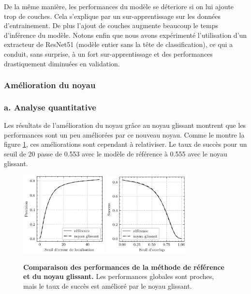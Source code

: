 \documentclass[10pt,twocolumn,letterpaper,french]{article}
\begin{document}
De la même manière, les performances du modèle se déteriore si on lui ajoute trop de couches. Cela s'explique par un sur-apprentissage sur les données d'entrainement. De plus l'ajout de couches augmente beaucoup le temps d'inférence du modèle. Notons enfin que nous avons expérimenté l'utilisation d'un extracteur de ResNet51 \cite{he2015deep} (modèle entier sans la tête de classification), ce qui a conduit, sans surprise, à un fort sur-apprentissage et des performances drastiquement diminuées en validation. 




\subsubsection*{Amélioration du noyau}

\subsubsection*{a. Analyse quantitative}

Les résultats de l'amélioration du noyau grâce au noyau glissant montrent que les performances sont un peu améliorées par ce nouveau noyau. Comme le montre la figure \ref{courbes_prec2}, ces améliorations sont cependant à relativiser. Le taux de succès pour un seuil de 20 passe de 0.553 avec le modèle de référence à 0.555 avec le noyau glissant.

\begin{figure}[!h]
  \centering
  \includegraphics[width=125pt]{images/gamma/courbes_pre.png} 
  \includegraphics[width=125pt]{images/gamma/courbes_succ.png} 
  \caption{\textbf{Comparaison des performances de la méthode de référence et du noyau glissant.} Les performances globales sont proches, mais le taux de succès est amélioré par le noyau glissant.}
  \label{courbes_prec2}
  \end{figure}
  
\end{document}
